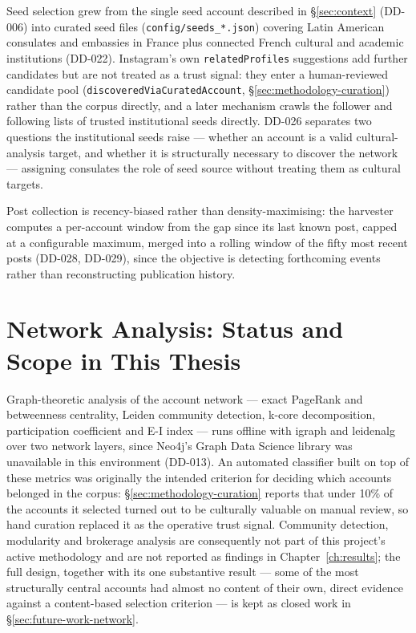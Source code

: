 \documentclass[12pt, a4paper]{report}
\begin{document}
Seed selection grew from the single seed account described in
\S\ref{sec:context} (DD-006) into curated seed files
(\texttt{config/seeds\_*.json}) covering Latin American consulates and
embassies in France plus connected French cultural and academic
institutions (DD-022). Instagram's own \texttt{relatedProfiles}
suggestions add further candidates but are not treated as a trust
signal: they enter a human-reviewed candidate pool
(\texttt{discoveredViaCuratedAccount}, \S\ref{sec:methodology-curation})
rather than the corpus directly, and a later mechanism crawls the
follower and following lists of trusted institutional seeds directly.
DD-026 separates two questions the institutional seeds raise — whether
an account is a valid cultural-analysis target, and whether it is
structurally necessary to discover the network — assigning consulates
the role of seed source without treating them as cultural targets.

Post collection is recency-biased rather than density-maximising: the
harvester computes a per-account window from the gap since its last
known post, capped at a configurable maximum, merged into a rolling
window of the fifty most recent posts (DD-028, DD-029), since the
objective is detecting forthcoming events rather than reconstructing
publication history.

\section{Network Analysis: Status and Scope in This Thesis}
\label{sec:network-methods}
Graph-theoretic analysis of the account network — exact PageRank and
betweenness centrality, Leiden community detection, k-core decomposition,
participation coefficient and E-I index — runs offline with igraph and
leidenalg over two network layers, since Neo4j's Graph Data Science
library was unavailable in this environment (DD-013). An automated
classifier built on top of these metrics was originally the intended
criterion for deciding which accounts belonged in the corpus:
\S\ref{sec:methodology-curation} reports that under 10\% of the accounts
it selected turned out to be culturally valuable on manual review, so
hand curation replaced it as the operative trust signal. Community
detection, modularity and brokerage analysis are consequently not part
of this project's active methodology and are not reported as findings in
Chapter~\ref{ch:results}; the full design, together with its one
substantive result — some of the most structurally central accounts had
almost no content of their own, direct evidence against a content-based
selection criterion — is kept as closed work in
\S\ref{sec:future-work-network}.
\end{document}
